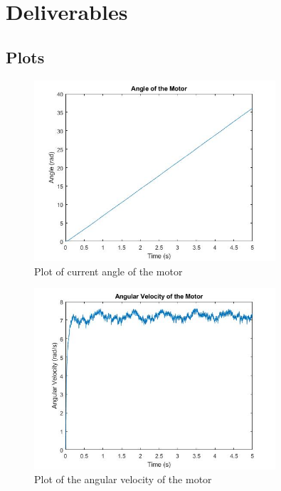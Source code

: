

\section{Deliverables}

\subsection{Plots}

\begin{figure}[H]
	\centering
	\includegraphics[width=0.8\textwidth]{./figures/theta_plot.jpg}
	\caption{Plot of current angle of the motor}
	\label{fig:theta_plot}
\end{figure}
\begin{figure}[H]
	\centering
	\includegraphics[width=0.8\textwidth]{./figures/omega_plot.jpg}
	\caption{Plot of the angular velocity of the motor}
	\label{fig:omega_plot}
\end{figure}
